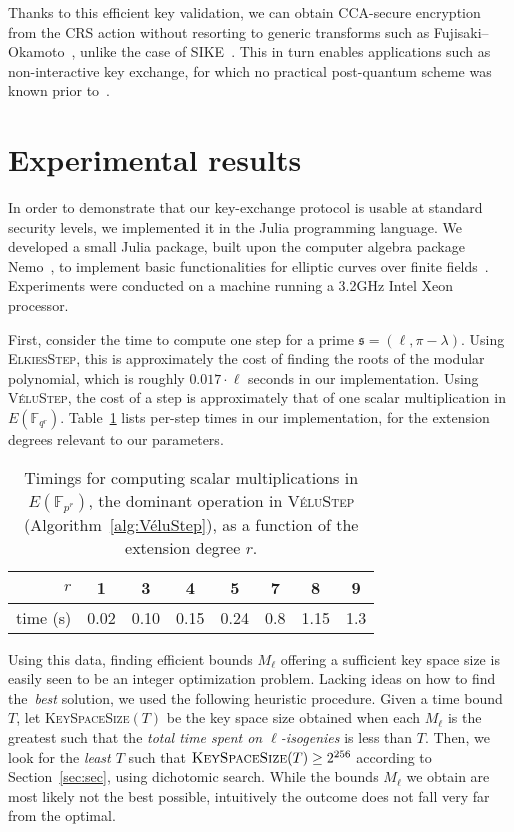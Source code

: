 \documentclass{llncs}
\newcommand{\F}{\mathbb{F}}
\newcommand{\algstyle}[1]{\textsc{#1}}
\renewcommand{\frak}{\mathfrak}
\begin{document}
Thanks to this efficient key validation, 
we can obtain CCA-secure encryption from the
CRS action without resorting to generic transforms such as
Fujisaki--Okamoto~\cite{10.1007/3-540-48405-1_34}, unlike the case of
SIKE~\cite{SIKE,10.1007/978-3-319-70500-2_12}. This in turn enables
applications such as non-interactive key exchange, for which no
practical post-quantum scheme was known prior to~\cite{csidh}.


\section{Experimental results}
\label{sec:exp}

In order to demonstrate that our key-exchange protocol is usable
at standard security levels, we implemented it in the Julia
programming language.
We developed a small Julia package, built upon 
the computer algebra package Nemo~\cite{nemo},
to implement basic functionalities
for elliptic curves over finite fields~\cite{todo:package}.
Experiments were conducted on a machine running a 3.2GHz Intel Xeon processor.

First, consider the
time to compute one step for a prime $\frak s = (\ell,\pi-\lambda)$.
Using \algstyle{ElkiesStep}, this is approximately
the cost of finding the roots of the modular polynomial,
which is roughly $0.017\cdot\ell$ seconds in our implementation.
Using \algstyle{VéluStep}, the cost of a step is approximately
that of one scalar multiplication in $E(\F_{q^r})$.
Table~\ref{tab:time-vs-r} lists per-step times in our implementation,
for the extension degrees relevant to our parameters.

\begin{table}
    \centering
    \begin{tabular}{r@{\;}|@{\;}c@{\ \ }c@{\ \ }c@{\ \ }c@{\ \ }c@{\ \ }c@{\ \ }c}
        $r$ & 1 & 3 & 4 & 5 & 7 & 8 & 9 \\
        \hline
        time (s) & 0.02 & 0.10 & 0.15 & 0.24 & 0.8 & 1.15 & 1.3
    \end{tabular}
    \smallskip
    \caption{Timings for computing scalar multiplications in
    $E(\F_{p^r})$, the dominant operation in \algstyle{VéluStep}
    (Algorithm~\ref{alg:VéluStep}), as a function of the extension
    degree $r$.}
    \label{tab:time-vs-r}
\end{table}

Using this data, finding efficient bounds $M_\ell$
offering a sufficient key space size is easily seen to be an
integer optimization problem. Lacking ideas on how to find
the~\emph{best} solution, we used the following heuristic procedure.
Given a time bound $T$, let \algstyle{KeySpaceSize}$(T)$ be
the key space size obtained when each $M_\ell$ is the greatest such
that the \emph{total time spent on $\ell$-isogenies} is less than $T$.
Then, we look for the \emph{least $T$} such that
$
	\algstyle{KeySpaceSize}(T)\geq 2^{256}
$
according to Section~\ref{sec:sec}, using dichotomic search.
While the bounds $M_\ell$
we obtain are most likely not the best possible, intuitively
the outcome does not fall very far from the optimal.
\end{document}
